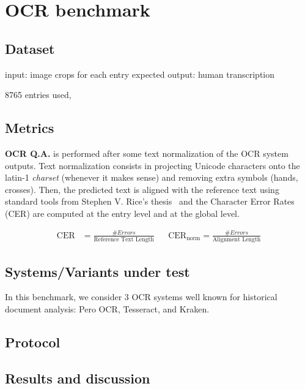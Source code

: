\section{OCR benchmark}
\label{sec:ocr-xp}

\subsection{Dataset}
input: image crops for each entry
expected output: human transcription

8765 entries used, 

\subsection{Metrics}
\textbf{OCR Q.A.} is performed after some text normalization of the OCR system outputs. Text normalization consists in
projecting Unicode characters onto the latin-1 \emph{charset} (whenever it makes sense) and removing extra symbols (hands,
crosses). Then, the predicted text is aligned with the reference text using standard tools from Stephen V. Rice's
thesis~\cite{santos.2019.wcmel,neudecker.2021.whdip} and the Character Error Rates (CER) are computed at the entry level
and at the global level. 

\begin{align}
\mathrm{CER} &=  \frac{\#Errors}{\text{Reference Text Length}} & & \mathrm{CER}_\mathrm{norm} =  \frac{\#Errors}{\text{Alignment Length}} 
\end{align}

\subsection{Systems/Variants under test}
In this benchmark, we consider 3 OCR systems well known for historical document analysis: Pero OCR, Tesseract, and Kraken. 

\subsection{Protocol}

\subsection{Results and discussion}

